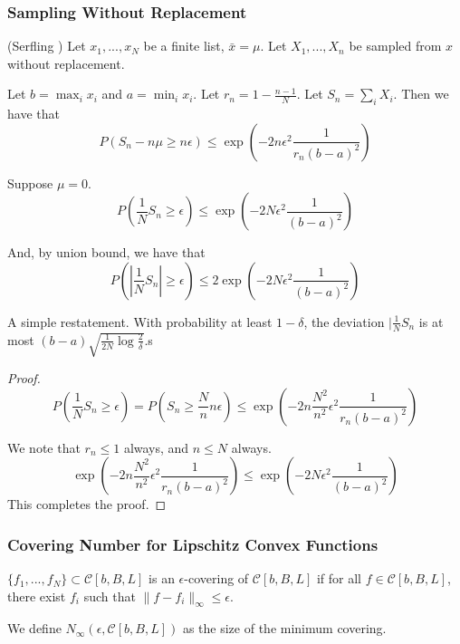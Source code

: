 \subsubsection{Sampling Without Replacement}

\begin{lemma} (Serfling \cite{serfling1974probability}) 
Let $x_1,..., x_N$ be a finite list, $\bar{x} = \mu$. Let $X_1,...,X_n$ be sampled from $x$ without replacement. 

Let $b = \max_i x_i$ and $a = \min_i x_i$. Let $r_n = 1- \frac{n-1}{N}$. Let $S_n = \sum_i X_i$.
Then we have that
\[
P( S_n - n \mu \geq n \epsilon) \leq \exp( - 2 n \epsilon^2 \frac{1}{r_n (b-a)^2})
\]
\end{lemma}

\begin{corollary}
\label{cor:serfling}
Suppose $\mu = 0$. 
\[
P( \frac{1}{N} S_n \geq \epsilon) \leq \exp( -2 N \epsilon^2 \frac{1}{(b-a)^2})
\]

And, by union bound, we have that
\[
P( | \frac{1}{N} S_n| \geq \epsilon) \leq 2 \exp( -2 N \epsilon^2 \frac{1}{(b-a)^2})
\]

\end{corollary}

A simple restatement. With probability at least $1- \delta$, the deviation $| \frac{1}{N} S_n$ is at most $ (b-a) \sqrt{ \frac{1}{2N} \log \frac{2}{\delta}}$.s

\begin{proof}
\[
P( \frac{1}{N} S_n \geq \epsilon) = P( S_n \geq \frac{N}{n} n \epsilon) \leq \exp( - 2 n \frac{N^2}{n^2} \epsilon^2 \frac{1}{r_n (b-a)^2} ) 
\]

We note that $r_n \leq 1$ always, and $n \leq N$ always. 
\[
\exp( - 2 n \frac{N^2}{n^2} \epsilon^2 \frac{1}{r_n (b-a)^2} )  \leq \exp( - 2 N \epsilon^2 \frac{1}{(b-a)^2})
\]
This completes the proof.

\end{proof}

\subsubsection{Covering Number for Lipschitz Convex Functions}

\begin{definition}
$\{ f_1,..., f_N\} \subset \mathcal{C}[b,B,L]$ is an $\epsilon$-covering of $\mathcal{C}[b,B,L]$ if for all $f \in \mathcal{C}[b,B,L]$, there exist $f_i$ such that $\| f - f_i \|_\infty \leq \epsilon$.

We define $N_\infty( \epsilon, \mathcal{C}[b,B,L])$ as the size of the minimum covering.
\end{definition}

